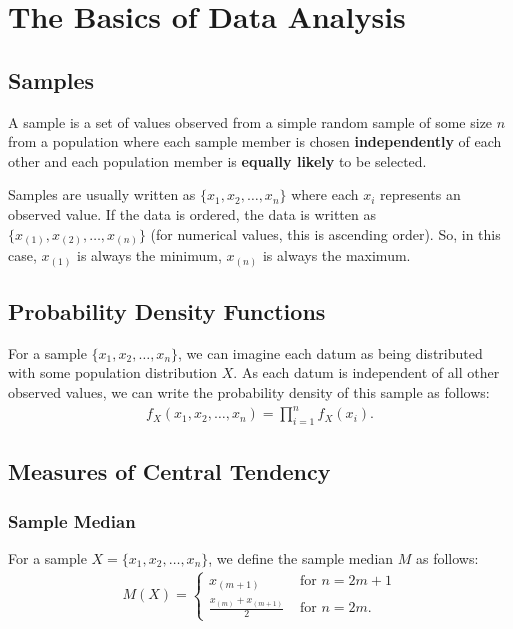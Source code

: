 \documentclass[a4paper, 12pt, twoside]{article}
\begin{document}
\newpage

\section{The Basics of Data Analysis}

\subsection{Samples}

A sample is a set of values observed from a simple random sample of
some size $n$ from a population where each sample member is chosen
\textbf{independently} of each other and each population member is
\textbf{equally likely} to be selected.

\vspace{\baselineskip}

Samples are usually written as $\{x_1, x_2, \ldots, x_n\}$ where
each $x_i$ represents an observed value. If the data is ordered,
the data is written as $\{x_{(1)}, x_{(2)}, \ldots, x_{(n)}\}$
(for numerical values, this is ascending order). So, in this
case, $x_{(1)}$ is always the minimum, $x_{(n)}$ is always
the maximum.

\subsection{Probability Density Functions}

For a sample $\{x_1, x_2, \ldots, x_n\}$, we can imagine each
datum as being distributed with some population distribution
$X$. As each datum is independent of all other observed values, we
can write the probability density of this sample as follows:
\begin{align*}
    f_X(x_1, x_2, \ldots, x_n) = \prod_{i = 1}^n f_X(x_i).
\end{align*}

\subsection{Measures of Central Tendency}

\subsubsection{Sample Median}

For a sample $X = \{x_1, x_2, \ldots, x_n\}$, we define the sample
median $M$ as follows:
\begin{align*}
    M(X) = \begin{cases}
        x_{(m + 1)}                     & \text{ for } n = 2m + 1 \\
        \frac{x_{(m)} + x_{(m + 1)}}{2} & \text{ for } n = 2m.
    \end{cases}
\end{align*}
\end{document}

